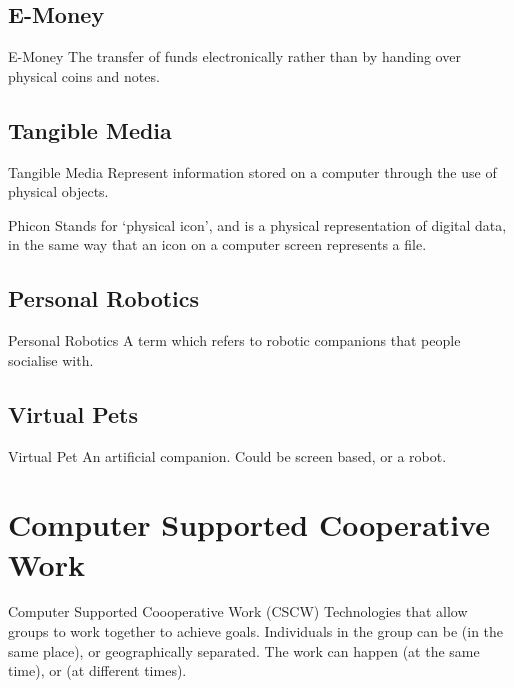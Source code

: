\documentclass[\main/notes.tex]{subfiles}
\begin{document}
			\subsection{E-Money}
				\begin{definition}{E-Money}
					The transfer of funds electronically rather than by handing over physical coins and notes.
				\end{definition}
			\subsection{Tangible Media}
				\begin{definition}{Tangible Media}
					Represent information stored on a computer through the use of physical objects.
				\end{definition}
				\begin{definition}{Phicon}
					Stands for `physical icon', and is a physical representation of digital data, in the same way that an icon on a computer screen represents a file.
				\end{definition}
			\subsection{Personal Robotics}
				\begin{definition}{Personal Robotics}
					A term which refers to robotic companions that people socialise with.
				\end{definition}
			\subsection{Virtual Pets}
				\begin{definition}{Virtual Pet}
					An artificial companion. Could be screen based, or a robot.
				\end{definition}

		\pagebreak
		\section{Computer Supported Cooperative Work}
			\begin{definition}{Computer Supported Coooperative Work (CSCW)}
				Technologies that allow groups to work together to achieve goals. Individuals in the group can be  (in the same place), or geographically separated. The work can happen  (at the same time), or  (at different times).
			\end{definition}
\end{document}
